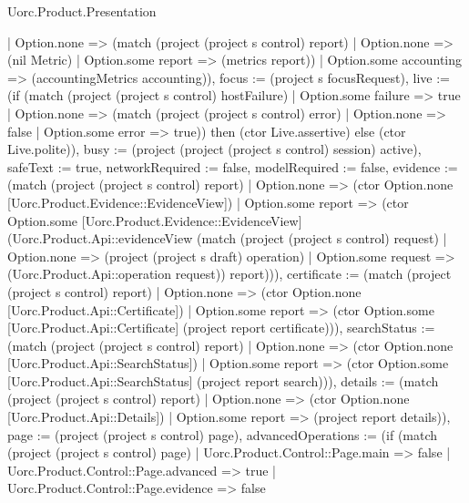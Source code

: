 \begin{lexlean}{Uorc.Product.Presentation}
\begin{semanticmodule}
{{    | Option.none => (match (project (project s control) report)
      | Option.none => (nil Metric)
      | Option.some report => (metrics report))
    | Option.some accounting => (accountingMetrics accounting)), focus := (project s focusRequest), live := (if (match (project (project s control) hostFailure)
    | Option.some failure => true
    | Option.none => (match (project (project s control) error)
      | Option.none => false
      | Option.some error => true)) then (ctor Live.assertive) else (ctor Live.polite)), busy := (project (project (project s control) session) active), safeText := true, networkRequired := false, modelRequired := false, evidence := (match (project (project s control) report)
    | Option.none => (ctor Option.none [Uorc.Product.Evidence::EvidenceView])
    | Option.some report => (ctor Option.some [Uorc.Product.Evidence::EvidenceView] (Uorc.Product.Api::evidenceView (match (project (project s control) request)
      | Option.none => (project (project s draft) operation)
      | Option.some request => (Uorc.Product.Api::operation request)) report))), certificate := (match (project (project s control) report)
    | Option.none => (ctor Option.none [Uorc.Product.Api::Certificate])
    | Option.some report => (ctor Option.some [Uorc.Product.Api::Certificate] (project report certificate))), searchStatus := (match (project (project s control) report)
    | Option.none => (ctor Option.none [Uorc.Product.Api::SearchStatus])
    | Option.some report => (ctor Option.some [Uorc.Product.Api::SearchStatus] (project report search))), details := (match (project (project s control) report)
    | Option.none => (ctor Option.none [Uorc.Product.Api::Details])
    | Option.some report => (project report details)), page := (project (project s control) page), advancedOperations := (if (match (project (project s control) page)
    | Uorc.Product.Control::Page.main => false
    | Uorc.Product.Control::Page.advanced => true
    | Uorc.Product.Control::Page.evidence => false
}}
\end{semanticmodule}
\end{lexlean}
